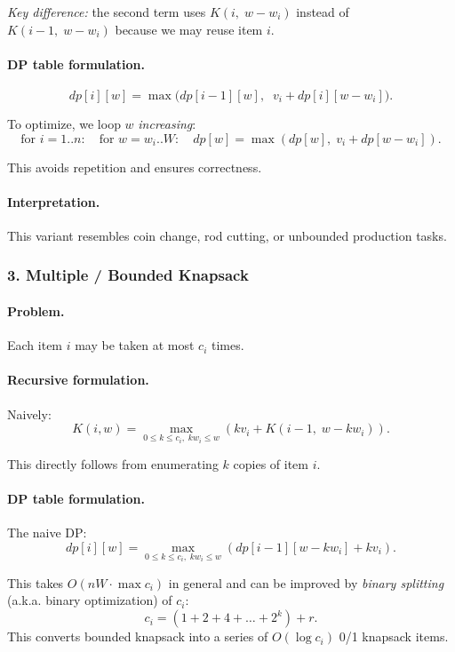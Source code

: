 \documentclass[9pt]{extarticle}
\begin{document}
\emph{Key difference:} the second term uses $K(i,\; w-w_i)$ instead of
$K(i-1,\;w-w_i)$ because we may reuse item $i$.

\paragraph{DP table formulation.}
\[
dp[i][w] =
\max\bigl(dp[i-1][w],\;\; v_i + dp[i][w-w_i]\bigr).
\]

To optimize, we loop $w$ \emph{increasing}:
\[
\text{for } i=1..n:
\quad
\text{for } w=w_i..W:
\quad
dp[w] = \max(dp[w],\; v_i + dp[w-w_i]).
\]

This avoids repetition and ensures correctness.

\paragraph{Interpretation.}
This variant resembles coin change, rod cutting, or unbounded production tasks.

\subsubsection*{3. Multiple / Bounded Knapsack}

\paragraph{Problem.}
Each item $i$ may be taken at most $c_i$ times.

\paragraph{Recursive formulation.}
Naively:
\[
K(i,w) = \max_{0 \le k \le c_i,\; k w_i \le w}
\left(
k v_i + K(i-1,\; w - k w_i)
\right).
\]

This directly follows from enumerating $k$ copies of item $i$.

\paragraph{DP table formulation.}
The naive DP:
\[
dp[i][w]
=
\max_{0 \le k \le c_i,\; k w_i \le w}
\left(
dp[i-1][w-k w_i] + k v_i
\right).
\]

This takes $O(n W \cdot \max c_i)$ in general and can be improved by
\emph{binary splitting} (a.k.a. binary optimization) of $c_i$:
\[
c_i = (1 + 2 + 4 + \dots + 2^k) + r.
\]
This converts bounded knapsack into a series of $O(\log c_i)$ 0/1 knapsack items.
\end{document}
